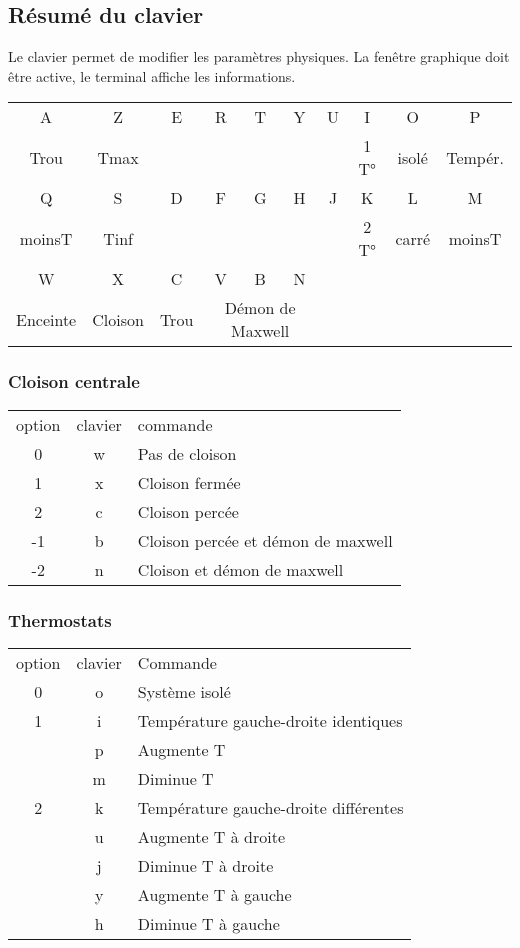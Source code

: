 \subsection{Résumé du clavier}
%
Le clavier permet de modifier les paramètres physiques. La fenêtre graphique doit être active, le terminal affiche les informations.
\begin{center}
\begin{tabular}{cccccccccc}
\sf A &\sf Z &\sf E &\sf R &\sf T &\sf Y &\sf U &\sf I &\sf O &\sf P \\
Trou & Tmax &  &  &  &  &  & 1 T° & isolé & Tempér. \\
\sf Q &\sf S &\sf D &\sf F &\sf G &\sf H &\sf J &\sf K &\sf L &\sf M \\
moinsT & Tinf &  &  &  &  &  & 2 T° & carré & moinsT \\
\sf W &\sf X &\sf C &\sf V &\sf B &\sf N &  &  &  & \\
Enceinte & Cloison & Trou & \multicolumn{3}{c}{Démon de Maxwell} &  &  &  & \\
\end{tabular}
\end{center}
\subsubsection{Cloison centrale}
%
\begin{center}
\begin{tabular}{ccl}
option & clavier & commande \\
0 & {\sf w} & Pas de cloison\\
1 & {\sf x} & Cloison fermée\\
2 & {\sf c} & Cloison percée\\
-1 & {\sf b} & Cloison percée et démon de maxwell \\
-2 & {\sf n} & Cloison et démon de maxwell \\
\end{tabular}
\end{center}
%
\subsubsection{Thermostats}
%
\begin{center}
\begin{tabular}{ccl}
option & clavier & Commande \\
0 & {\sf o} & Système isolé\\
1 & {\sf i} & Température gauche-droite identiques\\
 & {\sf p} & Augmente T\\
 & {\sf m} & Diminue T\\
2 & {\sf k} & Température gauche-droite différentes\\
 & {\sf u} & Augmente T à droite\\
 & {\sf j} & Diminue T à droite\\
 & {\sf y} & Augmente T à gauche\\
 & {\sf h} & Diminue T à gauche\\
\end{tabular}
\end{center}
%
